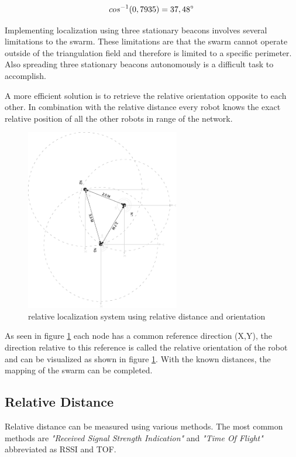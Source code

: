 \documentclass[10pt,a4paper]{article}
\begin{document}
\begin{equation}
cos^{-1}(0,7935) = 37,48\degree
\end{equation}

Implementing localization using three stationary beacons involves several limitations to the swarm. These limitations are that the swarm cannot operate outside of the triangulation field and therefore is limited to a specific perimeter. Also spreading three stationary beacons autonomously is a difficult task to accomplish.  

A more efficient solution is to retrieve the relative orientation opposite to each other. In combination with the relative distance every robot knows the exact relative position of all the other robots in range of the network.

\begin{figure}[H]
\centering
\includegraphics[angle=90, width=0.6\textwidth]{orientation.pdf}
\caption{relative localization system using relative distance and orientation}
\label{orientation}
\end{figure}

As seen in figure \ref{orientation} each node has a common reference direction (X,Y), the direction relative to this reference is called the relative orientation of the robot and can be visualized as shown in figure \ref{orientation}. With the known distances, the mapping of the swarm can be completed.
\newpage

\subsection{Relative Distance}
Relative distance can be measured using various methods. The most common methods are \textit{"Received Signal Strength Indication"} and \textit{"Time Of Flight"} abbreviated as RSSI and TOF. 
\end{document}
